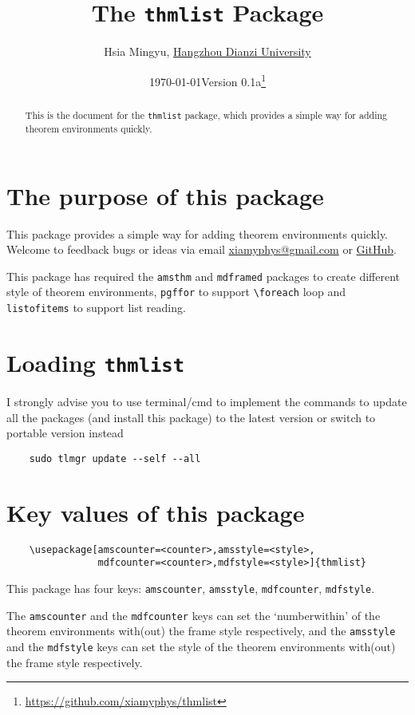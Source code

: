 \documentclass[11pt,svgnames]{article}
\title{\bfseries The \texttt{thmlist} Package}
\author{Hsia Mingyu, \href{https://www.hdu.edu.cn}{Hangzhou Dianzi University}}
\affil{\href{mailto:xiamyphys@gmail.com}{\ttfamily xiamyphys@gmail.com}}
\date{\today\quad Version 0.1a\thanks{\url{https://github.com/xiamyphys/thmlist}}}
\begin{document}
\maketitle\vspace*{-4ex}

\begin{abstract}
This is the document for the \verb+thmlist+ package, which provides a simple way for adding theorem environments quickly.
\end{abstract}

\section{The purpose of this package}
This package provides a simple way for adding theorem environments quickly. Welcome to feedback bugs or ideas via email \href{mailto:xiamyphys@gmail.com}{\ttfamily xiamyphys@gmail.com} or \href{https://github.com/xiamyphys/thmlist}{GitHub}.

This package has required the \verb+amsthm+ and \verb+mdframed+ packages to create different style of theorem environments, \verb+pgffor+ to support \verb|\foreach| loop and \verb+listofitems+ to support list reading.

\section{Loading \texttt{thmlist}}
I strongly advise you to use terminal/cmd to implement the commands to update all the packages (and install this package) to the latest version or switch to portable version instead
\begin{verbatim}
    sudo tlmgr update --self --all
\end{verbatim}

\section{Key values of this package}
\begin{verbatim}
    \usepackage[amscounter=<counter>,amsstyle=<style>,
                mdfcounter=<counter>,mdfstyle=<style>]{thmlist}
\end{verbatim}

This package has four keys: \verb|amscounter|, \verb|amsstyle|, \verb|mdfcounter|, \verb|mdfstyle|.

The \verb|amscounter| and the \verb|mdfcounter| keys can set the `numberwithin' of the theorem environments with(out) the frame style respectively, and the \verb|amsstyle| and the \verb|mdfstyle| keys can set the style of the theorem environments with(out) the frame style respectively.
\end{document}
